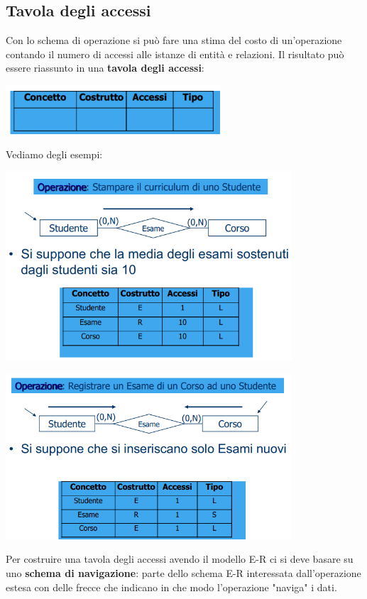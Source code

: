 \documentclass[12pt]{article}
\begin{document}
\subsection{Tavola degli accessi}
Con lo schema di operazione si può fare una stima del costo di un'operazione contando il numero di accessi alle istanze di entità e relazioni.
Il risultato può essere riassunto in una \textbf{tavola degli accessi}:
\begin{center}
    \includegraphics[width = 0.60\textwidth]{Images/92.PNG}
\end{center}
Vediamo degli esempi:
\begin{center}
    \includegraphics[width = 0.80\textwidth]{Images/93.PNG}
\end{center}
\begin{center}
    \includegraphics[width = 0.80\textwidth]{Images/94.PNG}
\end{center}
Per costruire una tavola degli accessi avendo il modello E-R ci si deve basare su uno \textbf{schema di navigazione}:
parte dello schema E-R interessata dall'operazione estesa con delle frecce che indicano in che modo l'operazione "naviga" i dati.
\end{document}
